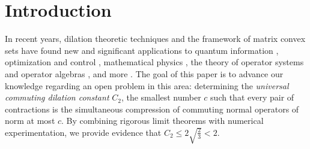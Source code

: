 \begin{abstract}
For a tuple $T$ of Hilbert space operators, the \emph{commuting dilation constant} is the smallest number $c$ such that the operators of $T$ are a simultaneous compression of commuting normal operators of norm at most $c$. We present numerical experiments giving a strong indication that the commuting dilation constant of a pair of independent random $N{\times}N$ unitary matrices converges to $\sqrt2$ as $N \to \infty$ almost surely. Under the assumption that this is the case, we prove that the commuting dilation constant of an arbitrary pair of contractions is strictly smaller than $2$. Our experiments are based on a simple algorithm that we introduce for the purpose of computing dilation constants between tuples of matrices.
\end{abstract}

\maketitle


\section{Introduction}

In recent years, dilation theoretic techniques and the framework of matrix convex sets have found new and significant applications to quantum information \cite{BlNe18,BlNe20,BNS23}, optimization and control \cite{HKMS19}, mathematical physics \cite{ALPP21,gerhold2023bounded}, the theory of operator systems and operator algebras \cite{DP22,FNT17,PaPa21}, and more \cite{CDN20,CDNV23,EPS25,HKM17}. 
The goal of this paper is to advance our knowledge regarding an open problem in this area: determining the {\em universal commuting dilation constant} $C_2$, \ie the smallest number $c$ such that every pair of contractions is the simultaneous compression of commuting normal operators of norm at most $c$. By combining rigorous limit theorems with numerical experimentation, we provide evidence that $C_2 \leq 2 \sqrt{\frac{2}{3}} < 2$. 

